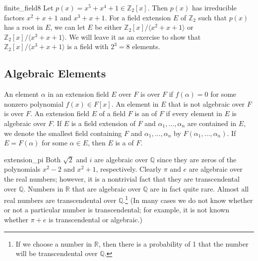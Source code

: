 \begin{example}{finite_field8}
Let $p(x) = x^5 + x^4 + 1 \in {\mathbb Z}_2[x]$. Then $p(x)$ has irreducible
factors $x^2 + x + 1$ and $x^3 + x + 1$. For a field extension $E$ of
${\mathbb Z}_2$ such that $p(x)$ has a root in $E$, we can let $E$
be either ${\mathbb Z}_2[x] / \langle x^2 + x + 1 \rangle$ or ${\mathbb Z}_2[x] /
\langle x^3 + x + 1 \rangle$.  We will leave it as an exercise to
show that ${\mathbb Z}_2[x] / \langle x^3 + x + 1 \rangle$ is a field
with $2^3=8$ elements. 
\end{example}


 
\subsection*{Algebraic Elements}
 

An element $\alpha$ in an extension field $E$ over $F$ is  over $F$ if $f(\alpha)=0$ for some nonzero polynomial $f(x)
\in F[x]$. An element in $E$ that is not algebraic over $F$ is 
over $F$. An extension field $E$ of a field $F$ is an  of
$F$ if every element in $E$ is algebraic over $F$. If $E$ is a field
extension of $F$ and $\alpha_1, \ldots, \alpha_n$ are contained in
$E$, we denote the smallest field containing $F$ and $\alpha_1,
\ldots, \alpha_n$ by $F( \alpha_1, \ldots,
\alpha_n)$\label{notefieldcont}. If $E = F(
\alpha )$ for some $\alpha \in E$, then $E$ is a  of $F$.  


\begin{example}{extension_pi}
Both $\sqrt{2}$ and $i$ are algebraic over ${\mathbb Q}$ since they are
zeros of the polynomials $x^2 -2$ and $x^2 + 1$, respectively. Clearly
$\pi$ and $e$ are algebraic over the real numbers; however, it is a
nontrivial fact that they are transcendental over ${\mathbb Q}$. Numbers
in ${\mathbb R}$ that are algebraic over ${\mathbb Q}$ are in fact quite
rare. Almost all real numbers are transcendental over ${\mathbb
Q}$.\footnote{If we choose a number in ${\mathbb R}$, then there is a
probability of 1 that the number will be transcendental over ${\mathbb
Q}$.}  
(In many cases we do not know whether or not a particular number is 
transcendental; for example, it is not known whether $\pi + e$ is
transcendental or algebraic.)  
\hspace*{1in}
\end{example}
 
